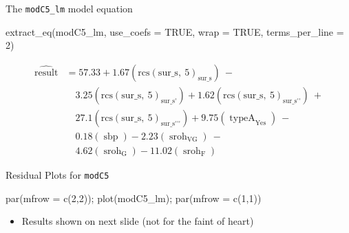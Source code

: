 \documentclass[
  ignorenonframetext,
]{beamer}
\newenvironment{Shaded}{\begin{snugshade}}{\end{snugshade}}
\newcommand{\AttributeTok}[1]{\textcolor[rgb]{0.77,0.63,0.00}{#1}}
\newcommand{\ConstantTok}[1]{\textcolor[rgb]{0.00,0.00,0.00}{#1}}
\newcommand{\DecValTok}[1]{\textcolor[rgb]{0.00,0.00,0.81}{#1}}
\newcommand{\FunctionTok}[1]{\textcolor[rgb]{0.00,0.00,0.00}{#1}}
\newcommand{\NormalTok}[1]{#1}
\providecommand{\tightlist}{%
  \setlength{\itemsep}{0pt}\setlength{\parskip}{0pt}}
\begin{document}
\begin{frame}[fragile]{The \texttt{modC5\_lm} model equation}
\protect\hypertarget{the-modc5_lm-model-equation}{}
\begin{Shaded}
\begin{Highlighting}[]
\FunctionTok{extract\_eq}\NormalTok{(modC5\_lm, }\AttributeTok{use\_coefs =} \ConstantTok{TRUE}\NormalTok{, }\AttributeTok{wrap =} \ConstantTok{TRUE}\NormalTok{, }
           \AttributeTok{terms\_per\_line =} \DecValTok{2}\NormalTok{)}
\end{Highlighting}
\end{Shaded}

\begin{equation}
\begin{aligned}
\operatorname{\widehat{result}} &= 57.33 + 1.67(\operatorname{rcs(sur\_s,\ 5)}_{\operatorname{sur\_s}})\ - \\
&\quad 3.25(\operatorname{rcs(sur\_s,\ 5)}_{\operatorname{sur\_s'}}) + 1.62(\operatorname{rcs(sur\_s,\ 5)}_{\operatorname{sur\_s''}})\ + \\
&\quad 27.1(\operatorname{rcs(sur\_s,\ 5)}_{\operatorname{sur\_s'''}}) + 9.75(\operatorname{typeA}_{\operatorname{Yes}})\ - \\
&\quad 0.18(\operatorname{sbp}) - 2.23(\operatorname{sroh}_{\operatorname{VG}})\ - \\
&\quad 4.62(\operatorname{sroh}_{\operatorname{G}}) - 11.02(\operatorname{sroh}_{\operatorname{F}})
\end{aligned}
\end{equation}
\end{frame}

\begin{frame}[fragile]{Residual Plots for \texttt{modC5}}
\protect\hypertarget{residual-plots-for-modc5}{}
\begin{Shaded}
\begin{Highlighting}[]
\FunctionTok{par}\NormalTok{(}\AttributeTok{mfrow =} \FunctionTok{c}\NormalTok{(}\DecValTok{2}\NormalTok{,}\DecValTok{2}\NormalTok{)); }\FunctionTok{plot}\NormalTok{(modC5\_lm); }\FunctionTok{par}\NormalTok{(}\AttributeTok{mfrow =} \FunctionTok{c}\NormalTok{(}\DecValTok{1}\NormalTok{,}\DecValTok{1}\NormalTok{))}
\end{Highlighting}
\end{Shaded}

\begin{itemize}
\tightlist
\item
  Results shown on next slide (not for the faint of heart)
\end{itemize}
\end{frame}
\end{document}
